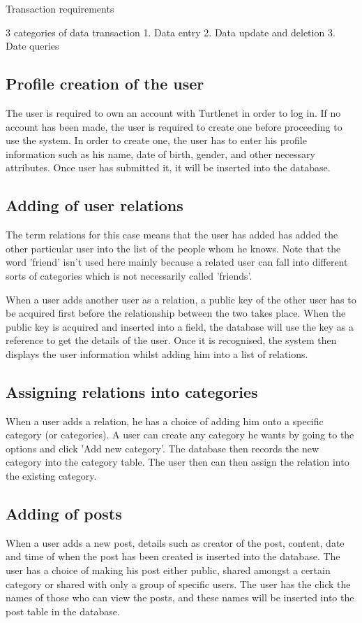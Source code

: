 Transaction requirements

3 categories of data transaction
1. Data entry
2. Data update and deletion
3. Date queries

\subsection{Profile creation of the user}
The user is required to own an account with Turtlenet in order to log in. If
no account has been made, the user is required to create one before proceeding
to use the system. In order to create one, the user has to enter his profile
information such as his name, date of birth, gender, and other necessary
attributes. Once user has submitted it, it will be inserted into the database.

\subsection{Adding of user relations}
The term relations for this case means that the user has added has added the
other particular user into the list of the people whom he knows. Note that the
word 'friend' isn't used here mainly because a related user can fall into
different sorts of categories which is not necessarily called 'friends'.

When a user adds another user as a relation, a public key of the other user has
to be acquired first before the relationship between the two takes place. When
the public key is acquired and inserted into a field, the database will use the
key as a reference to get the details of the user. Once it is recognised, the
system then displays the user information whilst adding him into a list of
relations.

\subsection{Assigning relations into categories}
When a user adds a relation, he has a choice of adding him onto a specific
category (or categories). A user can create any category he wants by going to
the options and click 'Add new category'. The database then records the new
category into the category table.  The user then can then assign the relation
into the existing category. 

\subsection{Adding of posts}
When a user adds a new post, details such as creator of the post, content, date
and time of when the post has been created is inserted into the database. The
user has a choice of making his post either public, shared amongst a certain
category or shared with only a group of specific users. The user has the click
the names of those who can view the posts, and these names will be inserted into
the post table in the database.

